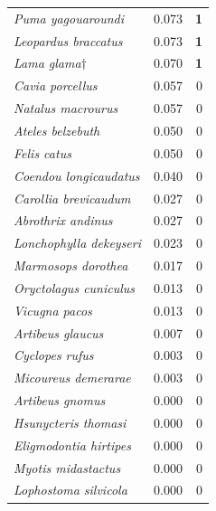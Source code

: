 \documentclass[12pt,a4paper]{article}
\begin{document}
\begin{longtable}{p{6.2cm}cr}
  \rowcolor{grisCelda}\textit{Puma yagouaroundi} & 0.073 & \textbf{1} \\
  \rowcolor{grisCelda}\textit{Leopardus braccatus} & 0.073 & \textbf{1} \\
  \rowcolor{grisCelda}\textit{Lama glama}$\dagger$ & 0.070 & \textbf{1} \\
  \textit{Cavia porcellus} & 0.057 & 0 \\
  \textit{Natalus macrourus} & 0.057 & 0 \\
  \textit{Ateles belzebuth} & 0.050 & 0 \\
  \textit{Felis catus} & 0.050 & 0 \\
  \textit{Coendou longicaudatus} & 0.040 & 0 \\
  \textit{Carollia brevicaudum} & 0.027 & 0 \\
  \textit{Abrothrix andinus} & 0.027 & 0 \\
  \textit{Lonchophylla dekeyseri} & 0.023 & 0 \\
  \textit{Marmosops dorothea} & 0.017 & 0 \\
  \textit{Oryctolagus cuniculus} & 0.013 & 0 \\
  \textit{Vicugna pacos} & 0.013 & 0 \\
  \textit{Artibeus glaucus} & 0.007 & 0 \\
  \textit{Cyclopes rufus} & 0.003 & 0 \\
  \textit{Micoureus demerarae} & 0.003 & 0 \\
  \textit{Artibeus gnomus} & 0.000 & 0 \\
  \textit{Hsunycteris thomasi} & 0.000 & 0 \\
  \textit{Eligmodontia hirtipes} & 0.000 & 0 \\
  \textit{Myotis midastactus} & 0.000 & 0 \\
  \textit{Lophostoma silvicola} & 0.000 & 0 \\
\end{longtable}
\end{document}
